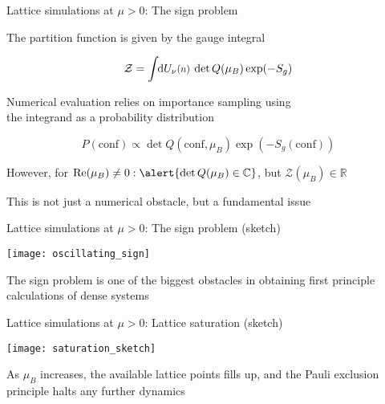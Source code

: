 \begin{frame}{Lattice simulations at \texorpdfstring{$\mu > 0$}{m > 0}: The sign problem}

  The partition function is given by the gauge integral

  \[
    \mathcal{Z} = \int \hspace*{-3pt} \mathrm{d} U_{\nu}\scalemath{0.85}{(n)} \: \det Q (\mu_B) \exp (- S_g )
  \]

  Numerical evaluation relies on \alert{importance sampling} using\\
  the integrand as a probability distribution

  \[
    P(\mathrm{conf}) \propto \det Q (\mathrm{conf}, \mu_B) \exp (-
    S_g(\mathrm{conf}))
  \]

  
  \vspace{.5em}

  However, for $\real(\mu_B) \neq 0: \alert{\det Q(\mu_B) \in \mathbb{C}}$, but
  $\mathcal{Z}(\mu_B) \in \mathbb{R}$

  \vspace{.5em}

  This is not just a numerical obstacle, but a \alert{fundamental issue}
  
\end{frame}

\begin{frame}{Lattice simulations at \texorpdfstring{$\mu > 0$}{m > 0}: The sign problem (sketch)}

  \begin{center}
    \texttt{[image: oscillating\_sign]}
  \end{center}

  \vspace{.5em}

  The sign problem is one of the \alert{biggest obstacles} in obtaining first
  principle calculations of dense systems

\end{frame}

\begin{frame}{Lattice simulations at \texorpdfstring{$\mu > 0$}{m > 0}: Lattice saturation (sketch)}

  \begin{center}
    \texttt{[image: saturation\_sketch]}
  \end{center}

  \vspace{-.2cm}

  As $\mu_B$ increases, the available lattice points fills up, and the
  \alert{Pauli exclusion principle} halts any further dynamics
  
\end{frame}


